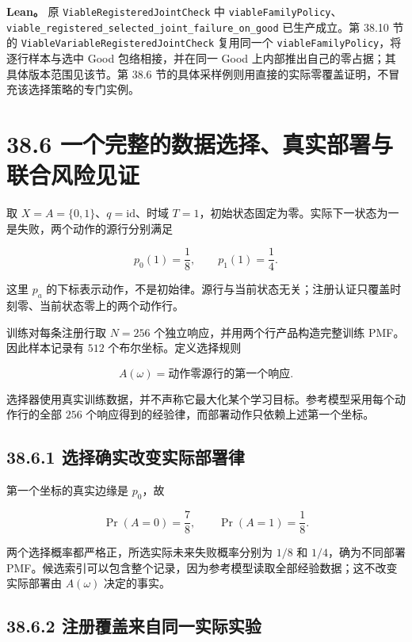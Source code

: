 \documentclass[
  11pt,
  oneside]{book}
\begin{document}
\textbf{Lean。} 原 \nolinkurl{ViableRegisteredJointCheck} 中 \nolinkurl{viableFamilyPolicy}、\nolinkurl{viable_registered_selected_joint_failure_on_good} 已生产成立。第 38.10 节的 \nolinkurl{ViableVariableRegisteredJointCheck} 复用同一个 \nolinkurl{viableFamilyPolicy}，将逐行样本与选中 Good 包络相接，并在同一 Good 上内部推出自己的零占据；其具体版本范围见该节。第 38.6 节的具体采样例则用直接的实际零覆盖证明，不冒充该选择策略的专门实例。

\section{38.6 一个完整的数据选择、真实部署与联合风险见证}\label{ux4e00ux4e2aux5b8cux6574ux7684ux6570ux636eux9009ux62e9ux771fux5b9eux90e8ux7f72ux4e0eux8054ux5408ux98ceux9669ux89c1ux8bc1}

取 \(X=A=\{0,1\}\)、\(q=\mathrm{id}\)、时域 \(T=1\)，初始状态固定为零。实际下一状态为一是失败，两个动作的源行分别满足

\[p_0(1)=\frac18,\qquad p_1(1)=\frac14.\]

这里 \(p_a\) 的下标表示动作，不是初始律。源行与当前状态无关；注册认证只覆盖时刻零、当前状态零上的两个动作行。

训练对每条注册行取 \(N=256\) 个独立响应，并用两个行产品构造完整训练 PMF。因此样本记录有 \(512\) 个布尔坐标。定义选择规则

\[A(\omega)=\text{动作零源行的第一个响应}.\]

选择器使用真实训练数据，并不声称它最大化某个学习目标。参考模型采用每个动作行的全部 \(256\) 个响应得到的经验律，而部署动作只依赖上述第一个坐标。

\subsection{38.6.1 选择确实改变实际部署律}\label{ux9009ux62e9ux786eux5b9eux6539ux53d8ux5b9eux9645ux90e8ux7f72ux5f8b}

第一个坐标的真实边缘是 \(p_0\)，故

\[\Pr(A=0)=\frac78,\qquad \Pr(A=1)=\frac18.\]

两个选择概率都严格正，所选实际未来失败概率分别为 \(1/8\) 和 \(1/4\)，确为不同部署 PMF。候选索引可以包含整个记录，因为参考模型读取全部经验数据；这不改变实际部署由 \(A(\omega)\) 决定的事实。

\subsection{38.6.2 注册覆盖来自同一实际实验}\label{ux6ce8ux518cux8986ux76d6ux6765ux81eaux540cux4e00ux5b9eux9645ux5b9eux9a8c}
\end{document}
